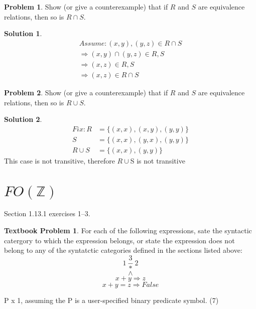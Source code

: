 \documentclass[10pt]{article}
\theoremstyle{definition}
\newtheorem{prob}{Problem}
\newtheorem{sol}{Solution}
\newtheorem{bp}{Textbook Problem}
\begin{document}
  \begin{prob}
    Show (or give a counterexample) that if $R$ and $S$ are equivalence relations, then so is $R \cap
    S$.
  \end{prob}
  
  \begin{sol}
   \begin{align}
   Assume: {(x,y),(y,z)} \in R \cap S \\
     \Rightarrow (x,y) \cap (y,z) \in R,S \\
     \Rightarrow (x,z) \in R,S \\
     \Rightarrow (x,z) \in R \cap S
   \end{align}
  \end{sol}
  
  \begin{prob}
    Show (or give a counterexample) that if $R$ and $S$ are equivalence relations, then so is
    $R \cup S$.
  \end{prob}
  
  \begin{sol}
  \begin{align}
    Fix: R &= \big\{(x,x),(x,y),(y,y)\big\} \\
    S &= \big\{(x,x),(y,x),(y,y)\big\} \\
      R \cup S  &= \big\{(x,x),(y,y)\big\}
  \end{align}
  This case is not transitive, therefore $R \cup $S is not transitive
  \end{sol}
  
  
  \section*{$FO(\mathbb Z)$}
  
  Section 1.13.1 exercises 1--3.
  
  
  \begin{bp}
  
	  For each of the following expressions, sate the syntactic catergory to which the expression belongs, or state the expression does not belong to any of the syntatctic categories defined in the sections listed above:
	  \begin{equation}
	  3
	  \end{equation}
	  \begin{equation}
	  1 - 2
	  \end{equation}
	  \begin{equation}
	  *
	  \end{equation}
	  \begin{equation}
	  \wedge
	  \end{equation}
	  \begin{equation}
	  x + y \Rightarrow z
	  \end{equation}
	  \begin{equation}
	  x + y = z \Rightarrow False 
	  \end{equation}
	 
\indent \indent \indent \indent \indent \indent   P x 1, assuming the P is a user-specified binary predicate symbol.       \indent \indent \indent \indent \indent    (7)   
  		
  \end{bp}
  
\end{document}
